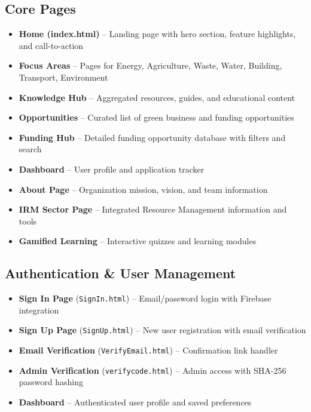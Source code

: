\documentclass[a4paper,12pt]{article}
\begin{document}
\subsection{Core Pages}
\begin{itemize}
    \item \textbf{Home (index.html)} – Landing page with hero section, feature highlights, and call-to-action
    \item \textbf{Focus Areas} – Pages for Energy, Agriculture, Waste, Water, Building, Transport, Environment
    \item \textbf{Knowledge Hub} – Aggregated resources, guides, and educational content
    \item \textbf{Opportunities} – Curated list of green business and funding opportunities
    \item \textbf{Funding Hub} – Detailed funding opportunity database with filters and search
    \item \textbf{Dashboard} – User profile and application tracker
    \item \textbf{About Page} – Organization mission, vision, and team information
    \item \textbf{IRM Sector Page} – Integrated Resource Management information and tools
    \item \textbf{Gamified Learning} – Interactive quizzes and learning modules
\end{itemize}

\subsection{Authentication \& User Management}
\begin{itemize}
    \item \textbf{Sign In Page} (\texttt{SignIn.html}) – Email/password login with Firebase integration
    \item \textbf{Sign Up Page} (\texttt{SignUp.html}) – New user registration with email verification
    \item \textbf{Email Verification} (\texttt{VerifyEmail.html}) – Confirmation link handler
    \item \textbf{Admin Verification} (\texttt{verifycode.html}) – Admin access with SHA-256 password hashing
    \item \textbf{Dashboard} – Authenticated user profile and saved preferences
\end{itemize}
\end{document}
